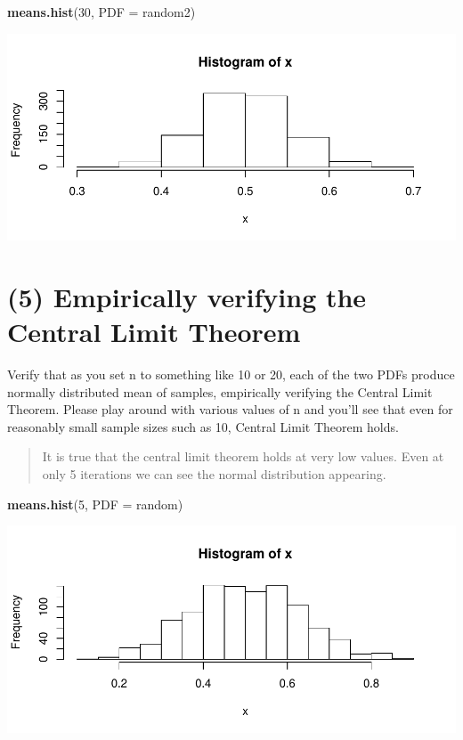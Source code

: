 \documentclass[]{article}
\newenvironment{Shaded}{\begin{snugshade}}{\end{snugshade}}
\newcommand{\KeywordTok}[1]{\textcolor[rgb]{0.13,0.29,0.53}{\textbf{{#1}}}}
\newcommand{\DataTypeTok}[1]{\textcolor[rgb]{0.13,0.29,0.53}{{#1}}}
\newcommand{\DecValTok}[1]{\textcolor[rgb]{0.00,0.00,0.81}{{#1}}}
\newcommand{\NormalTok}[1]{{#1}}
\begin{document}
\begin{Shaded}
\begin{Highlighting}[]
\KeywordTok{means.hist}\NormalTok{(}\DecValTok{30}\NormalTok{, }\DataTypeTok{PDF =} \NormalTok{random2)}
\end{Highlighting}
\end{Shaded}

\includegraphics{CHunt_Assign9_PS1_files/figure-latex/unnamed-chunk-7-1.pdf}
\newpage

\section{(5) Empirically verifying the Central Limit
Theorem}\label{empirically-verifying-the-central-limit-theorem}

Verify that as you set n to something like 10 or 20, each of the two
PDFs produce normally distributed mean of samples, empirically verifying
the Central Limit Theorem. Please play around with various values of n
and you'll see that even for reasonably small sample sizes such as 10,
Central Limit Theorem holds.

\begin{quote}
It is true that the central limit theorem holds at very low values. Even
at only 5 iterations we can see the normal distribution appearing.
\end{quote}

\begin{Shaded}
\begin{Highlighting}[]
\KeywordTok{means.hist}\NormalTok{(}\DecValTok{5}\NormalTok{, }\DataTypeTok{PDF =} \NormalTok{random)}
\end{Highlighting}
\end{Shaded}

\includegraphics{CHunt_Assign9_PS1_files/figure-latex/unnamed-chunk-8-1.pdf}
\end{document}
